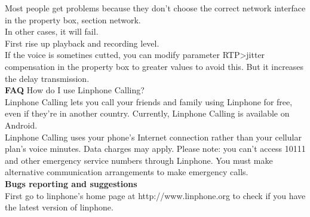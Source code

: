 \documentclass[a4paper]{article}
\begin{document}
Most people get problems because they don't choose the correct network interface
in the property box, section network. \\

In other cases, it will fail. \\
First rise up playback and recording level. \\
If the voice is sometines cutted, you can modify parameter RTP\->jitter \\
compensation in the property box to greater values to avoid this. But it increases the
delay transmission. \\

\textbf{FAQ}
How do I use Linphone Calling? \\
Linphone Calling lets you call your friends and family using Linphone for free, even if they're in another country. Currently, Linphone Calling is available on Android. \\
Linphone Calling uses your phone's Internet connection rather than your cellular plan's voice minutes. Data charges may apply.
Please note: you can't access 10111 and other emergency service numbers through Linphone. You must make alternative communication arrangements to make emergency calls. \\

\textbf{Bugs reporting and suggestions} \\
First go to linphone's home page at http://www.linphone.org to check if you have the
latest version of linphone. \\
\end{document}
